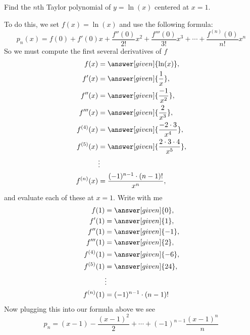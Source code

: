 \documentclass{ximera}
\begin{document}
\begin{example}
Find the $n$th Taylor polynomial of $y=\ln(x)$ centered at $x=1$.
\begin{explanation}
  To do this, we set $f(x) =\ln(x)$ and use the following formula:
    \[
    p_n(x) = f(0) + f'(0)x +\frac{f''(0)}{2!}x^2+\frac{f'''(0)}{3!}x^3+\cdots+\frac{f^{(n)}(0)}{n!}x^n
    \]
    So we must compute the first several derivatives of $f$
    \begin{align*}
      f(x) &= \answer[given]{\ln(x)},\\
      f'(x) &= \answer[given]{\frac{1}{x}},\\
      f''(x) &= \answer[given]{\frac{-1}{x^2}},\\
      f'''(x) &= \answer[given]{\frac{2}{x^3}},\\
      f^{(4)}(x) &= \answer[given]{\frac{-2\cdot 3}{x^4}},\\
      f^{(5)}(x) &= \answer[given]{\frac{2\cdot 3\cdot 4}{x^5}},\\
      &\vdots\\
      f^{(n)}(x) &= \frac{(-1)^{n-1}\cdot (n-1)!}{x^n},
    \end{align*}
    and evaluate each of these at $x=1$. Write with me
    \begin{align*}
      f(1) &= \answer[given]{0},\\
      f'(1) &= \answer[given]{1},\\
      f''(1) &= \answer[given]{-1},\\
      f'''(1) &= \answer[given]{2},\\
      f^{(4)}(1) &= \answer[given]{-6},\\
      f^{(5)}(1) &= \answer[given]{24},\\
      &\vdots\\
      f^{(n)}(1) &= (-1)^{n-1}\cdot (n-1)!
    \end{align*}
    Now plugging this into our formula above we see
    \[
    p_n = (x-1) -\frac{(x-1)^2}{2}+\cdots+(-1)^{n-1}\frac{(x-1)^n}{n}
    \]
\end{explanation}
\end{example}
\end{document}
